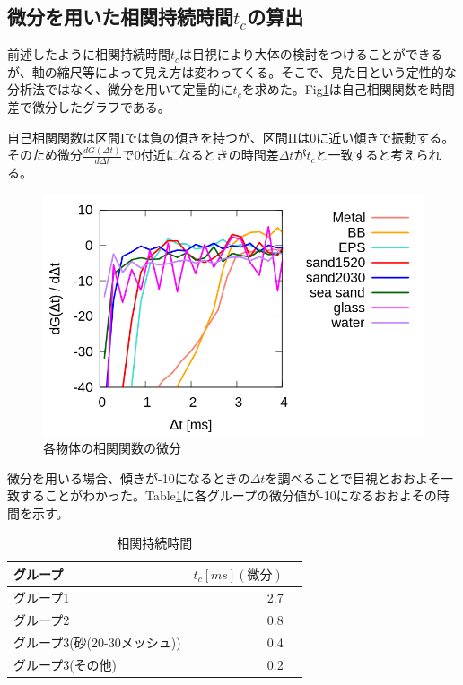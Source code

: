 \documentclass[a4paper,12pt,dvipdfmx]{jsarticle}
\newcommand{\Dt}{\Delta t}
\newcommand{\II}{I\hspace{-.1em}I}
\begin{document}
\subsection{微分を用いた相関持続時間$t_c$の算出}
前述したように相関持続時間$t_c$は目視により大体の検討をつけることができるが、軸の縮尺等によって見え方は変わってくる。そこで、見た目という定性的な分析法ではなく、微分を用いて定量的に$t_c$を求めた。Fig\ref{fig:diff}は自己相関関数を時間差で微分したグラフである。 \par
自己相関関数は区間Iでは負の傾きを持つが、区間\II は0に近い傾きで振動する。そのため微分$\frac{dG(\Dt)}{d\Dt}$で0付近になるときの時間差$\Dt がt_c$と一致すると考えられる。
\begin{figure}[H]
	\includegraphics[scale=0.4]{diff.png}
	\caption{各物体の相関関数の微分}
	\label{fig:diff}
\end{figure}
微分を用いる場合、傾きが-10になるときの$\Dt$を調べることで目視とおおよそ一致することがわかった。Table\ref{tb:tc_diff}に各グループの微分値が-10になるおおよその時間を示す。
\begin{table}[H]
	\caption{相関持続時間 \label{tb:tc_diff}}
	\begin{tabular}{lrr}
		\toprule
		グループ & $t_c [ms](微分)$  \\
		\midrule
		グループ1 & 2.7  \\
		グループ2 & 0.8  \\
		グループ3(砂(20-30メッシュ)) & 0.4  \\
		グループ3(その他) & 0.2 \\
		\bottomrule
	\end{tabular}
\end{table}
\end{document}
